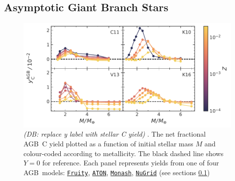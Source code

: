 \documentclass[fleqn,
usenatbib]{mnras}
\newcommand{\fruity}{\texttt{\hyperlink{fruity}{Fruity}}}
\newcommand{\nugrid}{\texttt{\hyperlink{nugrid}{NuGrid}}}
\newcommand{\monash}{\texttt{\hyperlink{monash}{Monash}}}
\newcommand{\aton}{\texttt{\hyperlink{aton}{ATON}}}
\newcommand{\agb}{AGB}
\newcommand{\y}{Y}
\newcommand{\dbnote}[1]{ {\color{Thistle} \textit{\small (DB: #1)}} }
\begin{document}
\subsection{Asymptotic Giant Branch Stars}\label{sec:agb}


\begin{figure}
    \centering
 	    \includegraphics[scale=1]{agb_yields.pdf}
        \caption[]{\dbnote{replace y label with stellar C yield}. The net fractional \agb\ C yield  plotted as a function of initial stellar mass $M$ and colour-coded according to metallicity. The black dashed line shows $\y=0$ for reference. Each panel represents yields from one of four \agb\ models: \fruity{}, \aton{}, \monash{}, \nugrid{} (see sections \ref{sec:agb}) }

        \label{fig:y_agb}
\end{figure}
\end{document}
